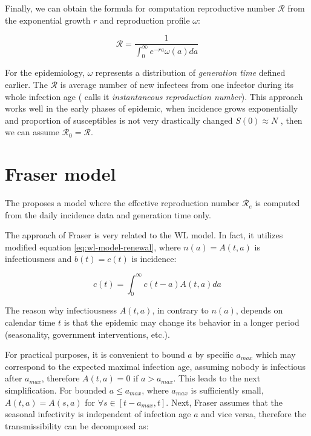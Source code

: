 \documentclass[
  digital, %
  oneside, %
  lof,     %
  lot,     %
]{fithesis4}
\begin{document}
Finally, we can obtain the formula for computation reproductive number
$\mathcal{R}$ from the exponential growth $r$ and reproduction profile $\omega$:

\begin{equation}\label{eq:wl-model-euler-lotka-R-final}
  \mathcal{R} = \frac{1}{\int_{0}^{\infty} e^{-ra} \omega(a) da}
\end{equation}

For the epidemiology, $\omega$ represents
a distribution of \textit{generation time} defined earlier.
The $\mathcal{R}$ is average number of new infectees from one infector
during its whole infection age (\cite{fraser2007} 
calls it \textit{instantaneous reproduction number}).
This approach works well in the early phases of epidemic,
when incidence grows exponentially
and proportion of susceptibles is not very drastically
changed $S(0) \approx N$ \cite{park2021}, then we can assume 
$\mathcal{R}_0 = \mathcal{R}$.


\section{Fraser model}
\label{sec:fraser-model}

The \cite{fraser2007} proposes a model where the effective 
reproduction number $\mathcal{R}_e$ is computed from the 
daily incidence data and generation time only.

The approach of Fraser is very related to the WL model.
In fact, it utilizes modified equation \eqref{eq:wl-model-renewal}, where $n(a) = A(t, a)$ is infectiousness and $b(t) = c(t)$ is incidence:

\begin{equation}
  c( t ) = \int^{\infty}_0 c ( t - a ) A ( t, a ) da
\end{equation}

The reason why infectiousness $A(t, a)$, in contrary to $n(a)$, depends on calendar time $t$ is that the epidemic may change its behavior in a longer period (seasonality, government interventions, etc.).

For practical purposes, it is convenient to bound $a$ by specific $a_{max}$ which may correspond to the expected maximal infection age, assuming nobody is infectious after $a_{max}$, therefore $A(t, a) = 0$ if $a > a_{max}$.
This leads to the next simplification.
For bounded $a \leq a_{max}$, where $a_{max}$ is sufficiently small, $A(t, a) = A(s, a)$ for $\forall s \in \left[ t - a_{max}, t \right]$.
Next, Fraser assumes that the seasonal infectivity is independent of infection age $a$ and vice versa, therefore the transmissibility can be decomposed as:
\end{document}
